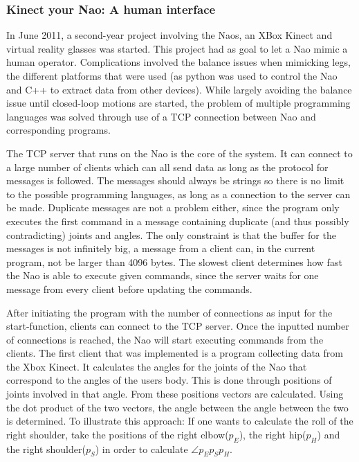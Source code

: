 \documentclass[11pt,a4paper,oneside]{article}
\begin{document}
\subsubsection{Kinect your Nao: A human interface}
In June 2011, a second-year project involving the Naos, an XBox Kinect and virtual reality glasses was started. This project had as goal to let a Nao mimic a human operator. Complications involved the balance issues when mimicking legs, the different platforms that were used (as python was used to control the Nao and C++ to extract data from other devices). While largely avoiding the balance issue until closed-loop motions are started, the problem of multiple programming languages was solved through use of a TCP connection between Nao and corresponding programs. 

The TCP server that runs on the Nao is the core of the system. It can connect to a large number of clients which can all send data as long as the protocol for messages is followed. The messages should always be strings so there is no limit to the possible programming languages, as long as a connection to the server can be made. Duplicate messages are not a problem either, since the program only executes the first command in a message containing duplicate (and thus possibly contradicting) joints and angles. The only constraint is that the buffer for the messages is not infinitely big, a message from a client can, in the current program, not be larger than 4096 bytes. The slowest client determines how fast the Nao is able to execute given commands, since the server waits for one message from every client before updating the commands.

After initiating the program with the number of connections as input for the start-function, clients can connect to the TCP server. Once the inputted number of connections is reached, the Nao will start executing commands from the clients.
The first client that was implemented is a program collecting data from the Xbox Kinect. It calculates the angles for the joints of the Nao that correspond to the angles of the users body. This is done through positions of joints involved in that angle. From these positions vectors are calculated. Using the dot product of the two vectors, the angle between the angle between the two is determined.
To illustrate this approach: If one wants to calculate the roll of the right shoulder, take the positions of the right elbow($p_{E}$), the right hip($p_{H}$) and the right shoulder($p_{S}$) in order to calculate $\angle p_{E}p_{S}p_{H}$.
\end{document}
